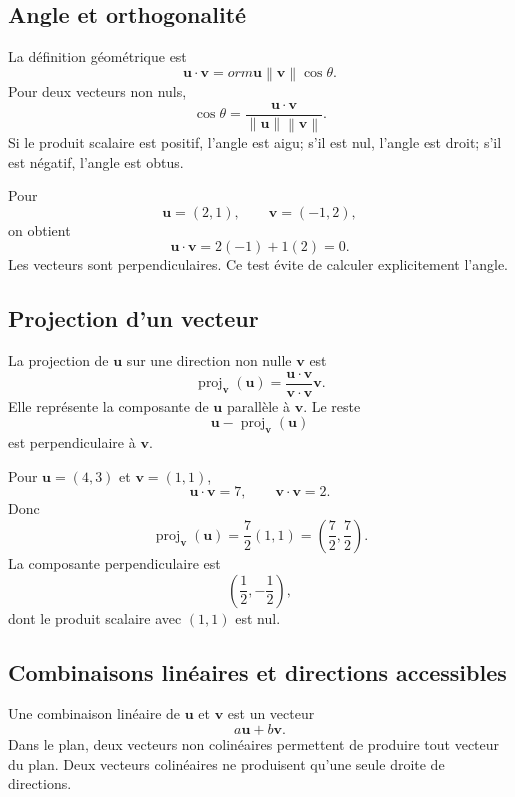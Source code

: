 \documentclass[12pt,a4paper,openany]{book}
\newcommand{\norm}[1]{\left\lVert #1\right\rVert}
\begin{document}
\subsection{Angle et orthogonalité}

La définition géométrique est
\[
\mathbf u\cdot\mathbf v
=
orm{\mathbf u}\norm{\mathbf v}\cos\theta.
\]
Pour deux vecteurs non nuls,
\[
\cos\theta=\frac{\mathbf u\cdot\mathbf v}{\norm{\mathbf u}\norm{\mathbf v}}.
\]
Si le produit scalaire est positif, l'angle est aigu; s'il est nul, l'angle est droit; s'il est négatif, l'angle est obtus.

\begin{examplebox}
Pour
\[
\mathbf u=(2,1),
\qquad
\mathbf v=(-1,2),
\]
on obtient
\[
\mathbf u\cdot\mathbf v=2(-1)+1(2)=0.
\]
Les vecteurs sont perpendiculaires. Ce test évite de calculer explicitement l'angle.
\end{examplebox}

\subsection{Projection d'un vecteur}

La projection de $\mathbf u$ sur une direction non nulle $\mathbf v$ est
\[
\operatorname{proj}_{\mathbf v}(\mathbf u)
=
\frac{\mathbf u\cdot\mathbf v}{\mathbf v\cdot\mathbf v}\mathbf v.
\]
Elle représente la composante de $\mathbf u$ parallèle à $\mathbf v$. Le reste
\[
\mathbf u-\operatorname{proj}_{\mathbf v}(\mathbf u)
\]
est perpendiculaire à $\mathbf v$.

\begin{examplebox}
Pour $\mathbf u=(4,3)$ et $\mathbf v=(1,1)$,
\[
\mathbf u\cdot\mathbf v=7,
\qquad
\mathbf v\cdot\mathbf v=2.
\]
Donc
\[
\operatorname{proj}_{\mathbf v}(\mathbf u)=\frac72(1,1)=\left(\frac72,\frac72\right).
\]
La composante perpendiculaire est
\[
\left(\frac12,-\frac12\right),
\]
dont le produit scalaire avec $(1,1)$ est nul.
\end{examplebox}

\subsection{Combinaisons linéaires et directions accessibles}

Une combinaison linéaire de $\mathbf u$ et $\mathbf v$ est un vecteur
\[
a\mathbf u+b\mathbf v.
\]
Dans le plan, deux vecteurs non colinéaires permettent de produire tout vecteur du plan. Deux vecteurs colinéaires ne produisent qu'une seule droite de directions.
\end{document}
